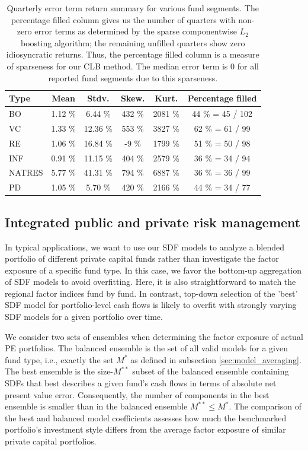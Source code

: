 \documentclass[12pt]{article}
\begin{document}
\begin{table}[ht]
	\centering
	\begin{tabular}{l | c c c c | c}
		Type & Mean  & Stdv. & Skew. & Kurt.  & Percentage filled \\
		\hline 
		\hline
		BO & 1.12 \% & 6.44 \% & 432 \% & 2081 \% & 44 \% = 45 / 102  \\ 
		VC & 1.33 \% & 12.36 \% &  553 \% & 3827 \% & 62 \% = 61 / 99 \\ 
		RE & 1.06 \% & 16.84 \% & -9 \% & 1799 \% & 51 \% = 50 / 98 \\ 
		INF & 0.91 \% & 11.15 \% & 404 \% & 2579 \% & 36 \% = 34 / 94  \\ 
		NATRES  & 5.77 \% & 41.31 \% & 794 \% & 6887 \% & 36 \% = 36 / 99 \\ 
		PD & 1.05 \% & 5.70 \% & 420 \% & 2166 \% & 44 \% = 34 / 77 \\ 
		\hline 
		\hline 
	\end{tabular} 
	\caption{
		Quarterly error term return summary for various fund segments.
		The percentage filled column gives us the number of quarters with non-zero error terms as determined by the sparse componentwise $L_2$ boosting algorithm; the remaining unfilled quarters show zero idiosyncratic returns.
		Thus, the percentage filled column is a measure of sparseness for our CLB method.
		The median error term is 0 for all reported fund segments due to this sparseness.
	}
\label{tab:error_summary}
\end{table}

\iffalse

\subsection{Integrated public and private risk management}
\label{sec:integrated_risk}

In typical applications, we want to use our SDF models to analyze a blended portfolio of different private capital funds rather than investigate the factor exposure of a specific fund type.
In this case, we favor the bottom-up aggregation of SDF models to avoid overfitting.
Here, it is also straightforward to match the regional factor indices fund by fund.
In contrast, top-down selection of the 'best' SDF model for portfolio-level cash flows is likely to overfit with strongly varying SDF models for a given portfolio over time.

We consider two sets of ensembles when determining the factor exposure of actual PE portfolios.
The balanced ensemble is the set of all valid models for a given fund type, i.e., exactly the set $M^*$ as defined in subsection \ref{sec:model_averaging}.
The best ensemble is the size-$M^{**}$ subset of the balanced ensemble containing SDFs that best describes a given fund's cash flows in terms of absolute net present value error. 
Consequently, the number of components in the best ensemble is smaller than in the balanced ensemble $M^{**} \leq M^*$.
The comparison of the best and balanced model coefficients assesses how much the benchmarked portfolio's investment style differs from the average factor exposure of similar private capital portfolios.
\end{document}
